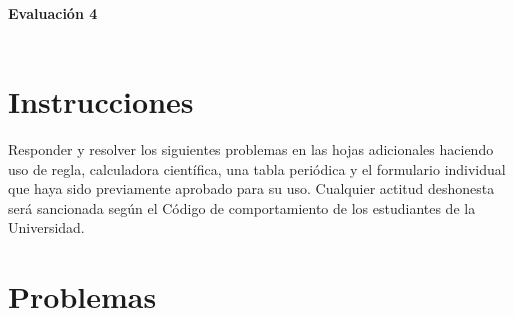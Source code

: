 \documentclass[a4paper,12pt]{article}
\begin{document}

\begin{center}
\HRule \\[0.4cm]
{ \bfseries Evaluaci\'on 4}\\ %
\HRule \\[0.4cm]
\end{center}


\section*{Instrucciones}

Responder y resolver los siguientes problemas en las hojas adicionales haciendo uso de regla, calculadora cient\'ifica, una tabla peri\'odica y el formulario individual que haya sido previamente aprobado para su uso. Cualquier actitud deshonesta ser\'a sancionada seg\'un el C\'odigo de comportamiento de los estudiantes de la Universidad.

\section*{Problemas}
\end{document}

